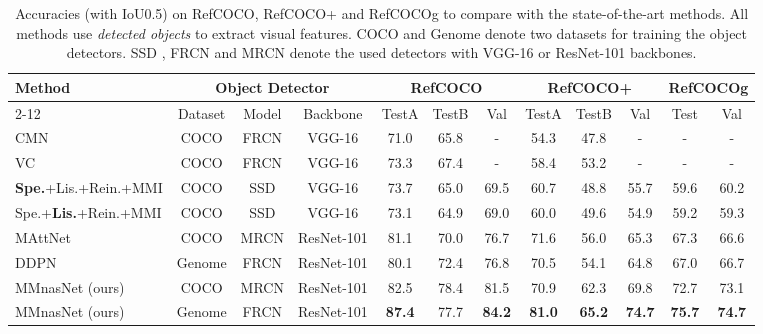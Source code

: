 \documentclass[sigconf]{acmart}
\begin{document}
\setcounter{table}{4}
\begin{table*}
\centering
\small
\caption{Accuracies (with IoU0.5) on RefCOCO, RefCOCO+ and RefCOCOg to compare with the state-of-the-art methods. All methods use \emph{detected objects} to extract visual features. COCO \cite{lin2014microsoft} and Genome \cite{krishna2017visual} denote two datasets for training the object detectors. SSD \cite{liu2016ssd}, FRCN \cite{ren2015faster} and MRCN \cite{he2017mask} denote the used detectors with VGG-16 \cite{simonyan2014very} or ResNet-101 \cite{he2015deep} backbones.
}\label{table:refcoco}
\begin{tabular}{l|ccc|ccc|ccc|cc}
\toprule
\multirow{3}{*}{Method} &\multicolumn{3}{c|}{Object Detector}& \multicolumn{3}{c|}{RefCOCO} & \multicolumn{3}{c}{RefCOCO+} & \multicolumn{2}{|c}{RefCOCOg}\\
\cmidrule{2-12}
&Dataset&Model&Backbone&  TestA & TestB & Val & TestA & TestB & Val & Test & Val \\
\midrule
CMN \cite{hu2017modeling} &COCO& FRCN &VGG-16 & 71.0 & 65.8 & - & 54.3 & 47.8 & - & - & -\\
VC \cite{zhang2018grounding} &COCO& FRCN &VGG-16 & 73.3 & 67.4 & - & 58.4 & 53.2 & - & - & -\\
\textbf{Spe.}+Lis.+Rein.+MMI \cite{yu2017joint} &COCO& SSD &VGG-16 & 73.7 & 65.0 & 69.5 & 60.7 & 48.8 & 55.7 & 59.6 & 60.2\\
Spe.+\textbf{Lis.}+Rein.+MMI \cite{yu2017joint} &COCO& SSD &VGG-16 & 73.1 & 64.9 & 69.0 & 60.0 & 49.6 & 54.9 & 59.2 & 59.3\\
MAttNet \cite{yu2018mattnet} &COCO& MRCN &ResNet-101 & 81.1 & 70.0 & 76.7 & 71.6 & 56.0 & 65.3 & 67.3 & 66.6 \\
DDPN \cite{yu2018rethinking} &Genome& FRCN &ResNet-101 & 80.1 & 72.4 & 76.8 & 70.5 & 54.1 & 64.8 & 67.0 & 66.7 \\
\midrule
MMnasNet (ours) & COCO & MRCN &ResNet-101 & 82.5 & 78.4 & 81.5 & 70.9 & 62.3 & 69.8 & 72.7 & 73.1\\
MMnasNet (ours) & Genome & FRCN &ResNet-101 & \textbf{87.4} & {77.7} & \textbf{84.2} & \textbf{81.0} & \textbf{65.2} & \textbf{74.7} & \textbf{75.7} & \textbf{74.7} \\
\bottomrule
\end{tabular}
\end{table*}
\end{document}
